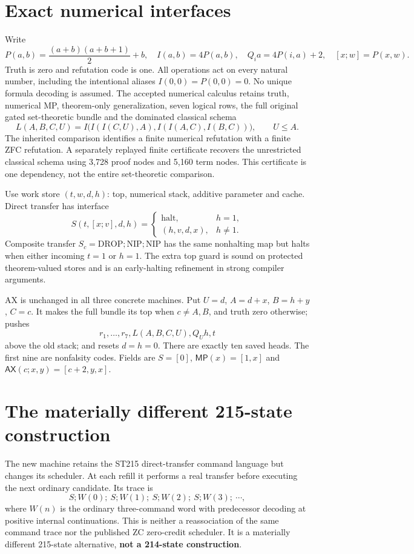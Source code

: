 \documentclass[11pt]{article}
\newcommand{\MP}{\mathsf{MP}}
\newcommand{\AX}{\mathsf{AX}}
\begin{document}
\section{Exact numerical interfaces}
Write
\[
 P(a,b)=\frac{(a+b)(a+b+1)}2+b,\quad I(a,b)=4P(a,b),\quad Q_i a=4P(i,a)+2,
 \quad [x;w]=P(x,w).
\]
Truth is zero and refutation code is one. All operations act on every natural number, including the intentional aliases $I(0,0)=P(0,0)=0$. No unique formula decoding is assumed. The accepted numerical calculus retains truth, numerical MP, theorem-only generalization, seven logical rows, the full original gated set-theoretic bundle and the dominated classical schema
\[
 L(A,B,C,U)=I\bigl(I(I(C,U),A),I(I(A,C),I(B,C))\bigr),\qquad U\le A.
\]
The inherited comparison identifies a finite numerical refutation with a finite ZFC refutation. A separately replayed finite certificate recovers the unrestricted classical schema using 3,728 proof nodes and 5,160 term nodes. This certificate is one dependency, not the entire set-theoretic comparison.

Use work store $(t,w,d,h)$: top, numerical stack, additive parameter and cache. Direct transfer has interface
\[
 S(t,[x;v],d,h)=\begin{cases}\mathrm{halt},&h=1,\\(h,v,d,x),&h\ne1.\end{cases}
\]
Composite transfer $S_c=\mathrm{DROP};\mathrm{NIP};\mathrm{NIP}$ has the same nonhalting map but halts when either incoming $t=1$ or $h=1$. The extra top guard is sound on protected theorem-valued stores and is an early-halting refinement in strong compiler arguments.

AX is unchanged in all three concrete machines. Put $U=d$, $A=d+x$, $B=h+y$, $C=c$. It makes the full bundle its top when $c\ne A,B$, and truth zero otherwise; pushes
\[
 r_1,\ldots,r_7,L(A,B,C,U),Q_Uh,t
\]
above the old stack; and resets $d=h=0$. There are exactly ten saved heads. The first nine are nonfalsity codes. Fields are $S=[0]$, $\MP(x)=[1,x]$ and $\AX(c;x,y)=[c+2,y,x]$.

\section{The materially different 215-state construction}
The new machine retains the ST215 direct-transfer command language but changes its scheduler. At each refill it performs a real transfer before executing the next ordinary candidate. Its trace is
\[
 S;W(0);\ S;W(1);\ S;W(2);\ S;W(3);\ \cdots,
\]
where $W(n)$ is the ordinary three-command word with predecessor decoding at positive internal continuations. This is neither a reassociation of the same command trace nor the published ZC zero-credit scheduler. It is a materially different 215-state alternative, \textbf{not a 214-state construction}.
\end{document}
